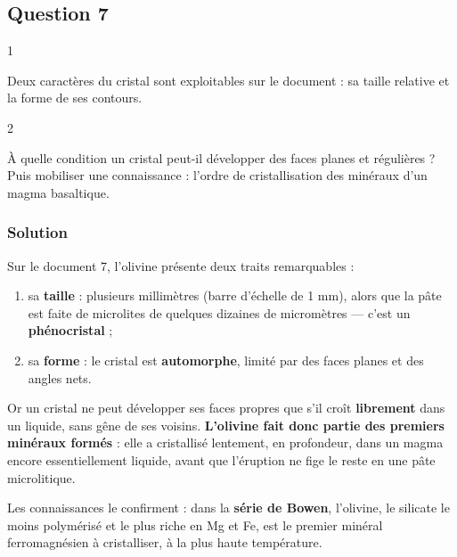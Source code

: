 \documentclass[11pt,a4paper]{article}
\providecommand{\tightlist}{\setlength{\itemsep}{0pt}\setlength{\parskip}{0pt}}
\begin{document}
\hypertarget{question-7}{%
\subsection{Question 7}\label{question-7}}

\begin{indication}{1}

Deux caractères du cristal sont exploitables sur le document : sa taille relative et la forme de ses contours.

\end{indication}

\begin{indication}{2}

À quelle condition un cristal peut-il développer des faces planes et régulières ? Puis mobiliser une connaissance : l'ordre de cristallisation des minéraux d'un magma basaltique.

\end{indication}

\hypertarget{solution-22}{%
\subsubsection{Solution}\label{solution-22}}

Sur le document 7, l'olivine présente deux traits remarquables :

\begin{enumerate}
\def\labelenumi{\arabic{enumi}.}
\tightlist
\item
  sa \textbf{taille} : plusieurs millimètres (barre d'échelle de 1 mm), alors que la pâte est faite de microlites de quelques dizaines de micromètres --- c'est un \textbf{phénocristal} ;
\item
  sa \textbf{forme} : le cristal est \textbf{automorphe}, limité par des faces planes et des angles nets.
\end{enumerate}

Or un cristal ne peut développer ses faces propres que s'il croît \textbf{librement} dans un liquide, sans gêne de ses voisins. \textbf{L'olivine fait donc partie des premiers minéraux formés} : elle a cristallisé lentement, en profondeur, dans un magma encore essentiellement liquide, avant que l'éruption ne fige le reste en une pâte microlitique.

Les connaissances le confirment : dans la \textbf{série de Bowen}, l'olivine, le silicate le moins polymérisé et le plus riche en Mg et Fe, est le premier minéral ferromagnésien à cristalliser, à la plus haute température.
\end{document}
